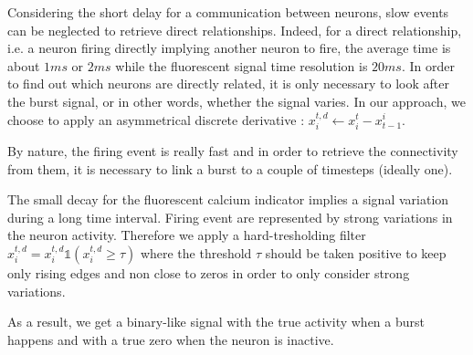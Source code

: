 \documentclass[wcp]{jmlr}
\begin{document}
Considering the short delay for a communication between
neurons, slow events can be neglected to retrieve direct relationships.
Indeed, for a direct relationship, i.e. a neuron firing directly implying another
neuron to fire, the average time is about $1ms$ or $2ms$ while the
fluorescent signal time resolution is $20ms$. In order to find out which neurons
are directly related, it is only necessary to look after the burst signal, or
in other words, whether the signal varies. In our approach, we choose to apply
an asymmetrical discrete derivative : $x^{t,d}_{i} \leftarrow x^{t}_i - x_{t-1}^i$.

By nature, the firing event is really fast and in order to
retrieve the connectivity from them, it is necessary to link a burst to a
couple of timesteps (ideally one).


The small decay for the fluorescent calcium indicator implies a signal
variation during a long time interval. Firing event are represented by 
strong variations in the neuron activity. Therefore we apply a hard-tresholding 
filter $x^{t,d}_i = x^{t,d}_i \mathbb{1}(x^{t,d}_i \geq \tau)$ where the threshold $\tau$ should be taken positive to keep only rising edges and non close to zeros in order to only consider strong variations. 


As a result, we get a binary-like signal with the true activity when a burst
happens and with a true zero when the neuron is inactive.




\end{document}
